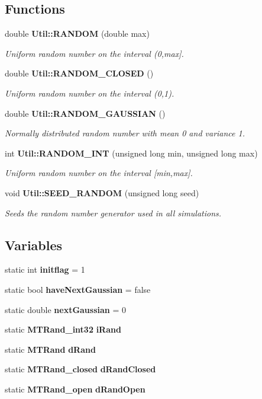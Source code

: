 \subsection*{Functions}
\begin{CompactItemize}
\item 
double {\bf Util::RANDOM} (double max)
\begin{CompactList}\small\item\em Uniform random number on the interval (0,max]. \item\end{CompactList}\item 
double {\bf Util::RANDOM\_\-CLOSED} ()
\begin{CompactList}\small\item\em Uniform random number on the interval (0,1). \item\end{CompactList}\item 
double {\bf Util::RANDOM\_\-GAUSSIAN} ()
\begin{CompactList}\small\item\em Normally distributed random number with mean 0 and variance 1. \item\end{CompactList}\item 
int {\bf Util::RANDOM\_\-INT} (unsigned long min, unsigned long max)
\begin{CompactList}\small\item\em Uniform random number on the interval [min,max]. \item\end{CompactList}\item 
void {\bf Util::SEED\_\-RANDOM} (unsigned long seed)
\begin{CompactList}\small\item\em Seeds the random number generator used in all simulations. \item\end{CompactList}\end{CompactItemize}
\subsection*{Variables}
\begin{CompactItemize}
\item 
static int {\bf initflag} = 1
\item 
static bool {\bf haveNextGaussian} = false
\item 
static double {\bf nextGaussian} = 0
\item 
static {\bf MTRand\_\-int32} {\bf iRand}
\item 
static {\bf MTRand} {\bf dRand}
\item 
static {\bf MTRand\_\-closed} {\bf dRandClosed}
\item 
static {\bf MTRand\_\-open} {\bf dRandOpen}
\end{CompactItemize}


